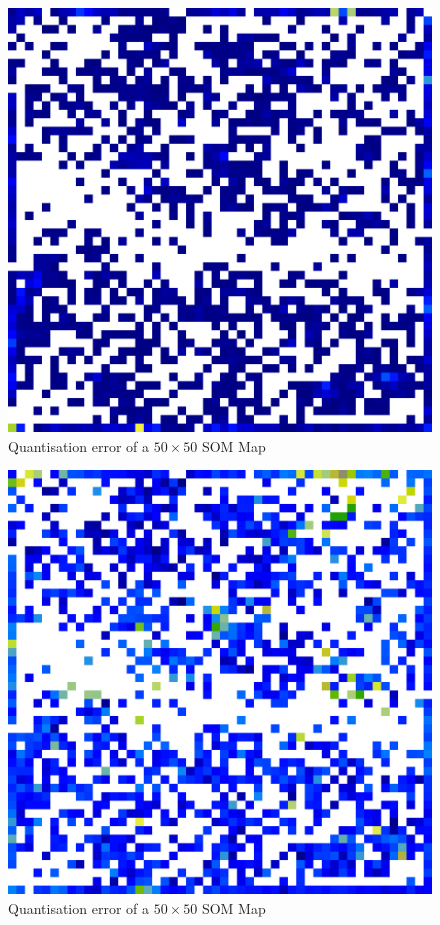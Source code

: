 \documentclass{acm_proc_article-sp}
\begin{document}
\begin{figure}
\centering
\includegraphics[width=\linewidth]{img/wine-big-quant-error}
\caption{Quantisation error of a $50\times50$ SOM Map}
\label{fig:wine-big-quant-error}
\end{figure}

\begin{figure}
\centering
\includegraphics[width=\linewidth]{img/wine-big-mean-quant-error}
\caption{Quantisation error of a $50\times50$ SOM Map}
\label{fig:wine-big-mean-quant-error}
\end{figure}
\end{document}
